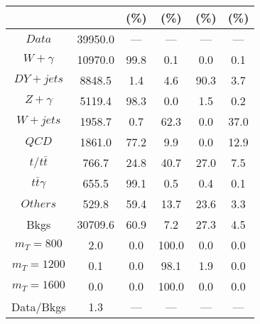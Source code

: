 \begin{figure}
\begin{minipage}[c]{0.32\textwidth}
{\begin{tabular}{cccccc}
 &  & (\%) & (\%) & (\%) & (\%)  \\
\hline
                                                                      $ Data $ &  39950.0 &  --- &  --- &  --- &  ---\\
$ W+\gamma $ &  10970.0 &  99.8 &  0.1 &  0.0 &  0.1\\
$ DY+jets $ &  8848.5 &  1.4 &  4.6 &  90.3 &  3.7\\
$ Z+\gamma $ &  5119.4 &  98.3 &  0.0 &  1.5 &  0.2\\
$ W+jets $ &  1958.7 &  0.7 &  62.3 &  0.0 &  37.0\\
$ QCD $ &  1861.0 &  77.2 &  9.9 &  0.0 &  12.9\\
$ t/t\bar{t} $ &  766.7 &  24.8 &  40.7 &  27.0 &  7.5\\
$ t\bar{t}\gamma $ &  655.5 &  99.1 &  0.5 &  0.4 &  0.1\\
$ Others $ &  529.8 &  59.4 &  13.7 &  23.6 &  3.3\\
Bkgs &  30709.6 &  60.9 &  7.2 &  27.3 &  4.5\\
$ m_{T} = 800 $ &  2.0 &  0.0 &  100.0 &  0.0 &  0.0\\
$ m_{T} = 1200 $ &  0.1 &  0.0 &  98.1 &  1.9 &  0.0\\
$ m_{T} = 1600 $ &  0.0 &  0.0 &  100.0 &  0.0 &  0.0\\
Data/Bkgs &  1.3 &  --- &  --- &  --- &  ---\\
\hline
\end{tabular}
}
\end{minipage}
\end{figure}

